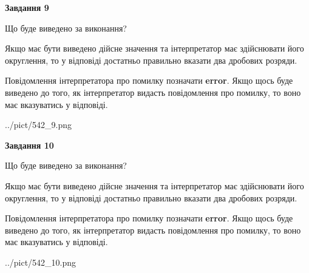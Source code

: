 \documentclass[12pt, ukrainian]{article}
\begin{document}
{\begin {Large}
{\begin {center}\textbf{Завдання 9}\end {center}}\par
Що буде виведено за виконання? \par

Якщо має бути виведено дійсне значення та інтерпретатор має здійснювати його округлення, 
то у відповіді достатньо правильно вказати два дробових розряди.

Повідомлення інтерпретатора про помилку позначати \textbf{error}.
Якщо щось буде виведено до того, як інтерпретатор видасть повідомлення про помилку, 
то воно має вказуватись у відповіді. \par

\begin{center}
	{../pict/542_9.png}
\end{center}
\newpage

{\begin {center}\textbf{Завдання 10}\end {center}}\par
Що буде виведено за виконання? \par

Якщо має бути виведено дійсне значення та інтерпретатор має здійснювати його округлення, 
то у відповіді достатньо правильно вказати два дробових розряди.

Повідомлення інтерпретатора про помилку позначати \textbf{error}.
Якщо щось буде виведено до того, як інтерпретатор видасть повідомлення про помилку, 
то воно має вказуватись у відповіді. \par

\begin{center}
	{../pict/542_10.png}
\end{center}
\newpage

\end {Large}}
\end{document}
